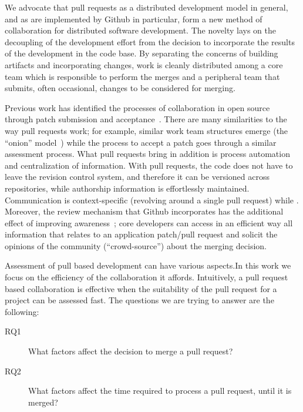 \documentclass{sig-alternate}
\begin{document}
We advocate that pull requests as a distributed development model in general,
and as are implemented by Github in particular, form a new method of
collaboration for distributed software development. The novelty lays on
the decoupling of the development effort from the decision to incorporate
the results of the development in the code base. 
By separating the concerns of building artifacts and incorporating
changes, work is cleanly distributed among a core team which is responsible
to perform the merges and a peripheral team that submits, often occasional,
changes to be considered for merging.

Previous work has identified the processes of collaboration in open source
through patch submission and acceptance~\cite{MOCKU02, Bird07, Weiss08}.  There
are many similarities to the way pull requests work; for example, similar work
team structures emerge (the ``onion'' model~\cite{Crow05}) while the process to
accept a patch goes through a similar assessment process.  What pull requests
bring in addition is process automation and centralization of information.
With pull requests, the code does not have to leave the revision control
system, and therefore it can be versioned across repositories, while authorship
information is effortlessly maintained. Communication is context-specific
(revolving around a single pull request) while .  Moreover, the review
mechanism that Github incorporates has the additional effect of improving
awareness~\cite{Dabbi12}; core developers can access in an efficient way all
information that relates to an application patch/pull request and solicit the
opinions of the community (``crowd-source'') about the merging decision.

Assessment of pull based development can have various aspects.In this work we
focus on the efficiency of the collaboration it affords. Intuitively, a pull
request based collaboration is effective when the suitability of the pull
request for a project can be assessed fast. The questions we
are trying to answer are the following:

\begin{description}

  \item[RQ1] What factors affect the decision to merge a pull request?

  \item[RQ2] What factors affect the time required to process a pull request,
    until it is merged?

\end{description}
\end{document}

